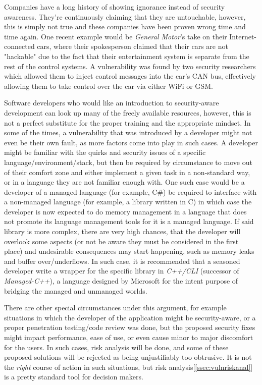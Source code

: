 \documentclass[a4paper,12pt]{article}
\begin{document}
	Companies have a long history of showing ignorance instead of security awareness. They're continuously claiming that they are untouchable, however, this is simply not true and these companies have been proven wrong time and time again. One recent example would be \textit{General Motor}'s take on their Internet-connected cars, where their spokesperson claimed that their cars are not "hackable" due to the fact that their entertainment system is separate from the rest of the control systems. A vulnerability was found by two security researchers\cite{cmiller15} which allowed them to inject control messages into the car's CAN bus, effectively allowing them to take control over the car via either WiFi or GSM.
	
	Software developers who would like an introduction to security-aware development can look up many of the freely available resources, however, this is not a perfect substitute for the proper training and the appropriate mindset. In some of the times, a vulnerability that was introduced by a developer might not even be their own fault, as more factors come into play in such cases. A developer might be familiar with the quirks and security issues of a specific language/environment/stack, but then be required by circumstance to move out of their comfort zone and either implement a given task in a non-standard way, or in a language they are not familiar enough with. One such case would be a developer of a managed language (for example, C\#) be required to interface with a non-managed language (for example, a library written in C) in which case the developer is now expected to do memory management in a language that does not promote its language management tools for it is a managed language. If said library is more complex, there are very high chances, that the developer will overlook some aspects (or not be aware they must be considered in the first place) and undesirable consequences may start happening, such as memory leaks and buffer over/underflows. In such case, it is recommended that a seasoned developer write a wrapper for the specific library in \textit{C++/CLI} (successor of \textit{Managed-C++}), a language designed by Microsoft for the intent purpose\cite{hstutter06} of bridging the managed and unmanaged worlds.
	
	There are other special circumstances under this argument, for example situations in which the developer of the application might be security-aware, or a proper penetration testing/code review was done, but the proposed security fixes might impact performance, ease of use, or even cause minor to major discomfort for the users. In such cases, risk analysis will be done, and some of these proposed solutions will be rejected as being unjustifiably too obtrusive. It is not the \textit{right} course of action in such situations, but risk analysis[\ref{ssec:vulnriskanal}] is a pretty standard tool for decision makers.
	
\end{document}
